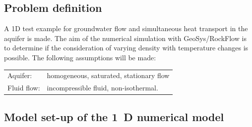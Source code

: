 \subsection{Problem definition}

A 1D test example for groundwater flow and simultaneous heat transport in the aquifer is made. The aim of the numerical simulation with GeoSys/RockFlow is to determine if the consideration of varying density with temperature changes is possible. The following assumptions will be made:

\begin{tabular}{ll}
Aquifer: & homogeneous, saturated, stationary flow\\
Fluid flow: & incompressible fluid, non-isothermal.\\
\end{tabular}

\subsection{Model set-up of the 1~D numerical model}

